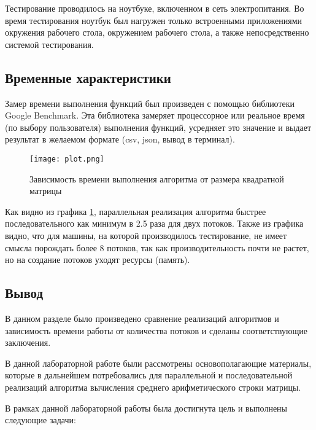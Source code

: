 Тестирование проводилось на ноутбуке, включенном в сеть электропитания. Во время тестирования ноутбук был нагружен только встроенными приложениями окружения рабочего стола, окружением рабочего стола, а также непосредственно системой тестирования.

\subsection{Временные характеристики}

Замер времени выполнения функций был произведен с помощью библиотеки Google Benchmark. Эта библиотека замеряет процессорное или реальное время (по выбору пользователя) выполнения функций, усредняет это значение и выдает результат в желаемом формате (csv, json, вывод в терминал).

\begin{figure}[H]
    \centering
    \texttt{[image: plot.png]}
    \caption{Зависимость времени выполнения алгоритма от размера квадратной матрицы}
    \label{img:benchmark}
\end{figure}

Как видно из графика \ref{img:benchmark}, параллельная реализация алгоритма быстрее последовательного как минимум в 2.5 раза для двух потоков. Также из графика видно, что для машины, на которой производилось тестирование, не имеет смысла порождать более 8 потоков, так как производительность почти не растет, но на создание потоков уходят ресурсы (память).

\subsection{Вывод}

В данном разделе было произведено сравнение реализаций алгоритмов и зависимость времени работы от количества потоков и сделаны соответствующие заключения.


В данной лабораторной работе были рассмотрены основополагающие материалы, которые в дальнейшем потребовались для параллельной и последовательной реализаций алгоритма вычисления среднего арифметического строки матрицы. 

В рамках данной лабораторной работы была достигнута цель и выполнены следующие задачи:

